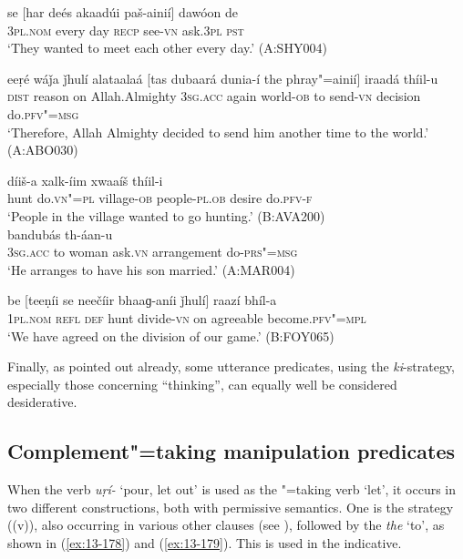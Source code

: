 \begin{exe}
\ex
\label{ex:13-173}
\gll se [har deés akaadúi paš-ainií] dawóon de \\
\textsc{3pl.nom} every day \textsc{recp} see-\textsc{vn} ask.\textsc{3pl} \textsc{pst} \\
\glt `They wanted to meet each other every day.' (A:SHY004)

\ex
\label{ex:13-174}
\gll eeṛé wáǰa ǰhulí alataalaá [tas dubaará dunia-í  the phray"=ainií] iraadá thíil-u \\
\textsc{dist} reason on Allah.Almighty \textsc{3sg.acc} again world-\textsc{ob}  to send-\textsc{vn} decision do.\textsc{pfv"=msg}  \\
\glt `Therefore, Allah Almighty decided to send him another time to the world.' (A:ABO030)

\ex
\label{ex:13-175}
 díiš-a xalk-íim xwaaíš thíil-i \\
hunt do.\textsc{vn"=pl} village-\textsc{ob} people-\textsc{pl.ob} desire do.\textsc{pfv-f} \\
\glt `People in the village wanted to go hunting.' (B:AVA200) \\

\ex
\label{ex:13-176}
 bandubás th-áan-u \\
\textsc{3sg.acc} to woman ask.\textsc{vn}  arrangement do-\textsc{prs"=msg} \\
\glt `He arranges to have his son married.' (A:MAR004)

\ex
\label{ex:13-177}
\gll be [teeṇíi se neečíir bhaaɡ-aníi ǰhulí]  raazí bhíl-a \\
\textsc{1pl.nom} \textsc{refl} \textsc{def} hunt divide-\textsc{vn} on agreeable become.\textsc{pfv"=mpl} \\
\glt `We have agreed on the division of our game.' (B:FOY065) 
\end{exe}

Finally, as pointed out already, some utterance predicates, using the \textit{ki}-strategy, especially those concerning ``thinking'', can equally well be considered desiderative.


\subsection{Complement"=taking manipulation predicates}
\label{subsec:13-5-3}

 When the verb \textit{uṛí-} `pour, let out' is used as the "=taking verb `let', it occurs in two different constructions, both with permissive semantics. One is the  strategy ((v)), also occurring in various other  clauses (see ), followed by the  \textit{the} `to', as shown in (\ref{ex:13-178}) and (\ref{ex:13-179}). This is used in the indicative.

